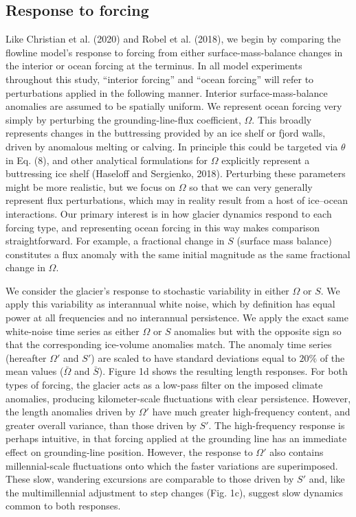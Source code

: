\documentclass[tc, manuscript]{copernicus}
\begin{document}
\subsection{Response to forcing}

Like Christian et al. (2020) and Robel et al. (2018), we begin by comparing the flowline model's response to forcing from either surface-mass-balance changes in the interior or ocean forcing at the terminus. In all model experiments throughout this study, “interior forcing” and “ocean forcing” will refer to perturbations applied in the following manner. Interior surface-mass-balance anomalies are assumed to be spatially uniform. We represent ocean forcing very simply by perturbing the grounding-line-flux coefficient, $\Omega$. This broadly represents changes in the buttressing provided by an ice shelf or fjord walls, driven by anomalous melting or calving. In principle this could be targeted via $\theta$ in Eq. (8), and other analytical formulations for $\Omega$ explicitly represent a buttressing ice shelf (Haseloff and Sergienko, 2018). Perturbing these parameters might be more realistic, but we focus on $\Omega$ so that we can very generally represent flux perturbations, which may in reality result from a host of ice–ocean interactions. Our primary interest is in how glacier dynamics respond to each forcing type, and representing ocean forcing in this way makes comparison straightforward. For example, a fractional change in $S$ (surface mass balance) constitutes a flux anomaly with the same initial magnitude as the same fractional change in $\Omega$.

We consider the glacier's response to stochastic variability in either $\Omega$ or $S$. We apply this variability as interannual white noise, which by definition has equal power at all frequencies and no interannual persistence. We apply the exact same white-noise time series as either $\Omega$ or $S$ anomalies but with the opposite sign so that the corresponding ice-volume anomalies match. The anomaly time series (hereafter $\Omega'$ and $S'$) are scaled to have standard deviations equal to $20\%$ of the mean values ($\bar{\Omega}$ and $\bar{S}$). Figure 1d shows the resulting length responses. For both types of forcing, the glacier acts as a low-pass filter on the imposed climate anomalies, producing kilometer-scale fluctuations with clear persistence. However, the length anomalies driven by $\Omega'$ have much greater high-frequency content, and greater overall variance, than those driven by $S'$. The high-frequency response is perhaps intuitive, in that forcing applied at the grounding line has an immediate effect on grounding-line position. However, the response to $\Omega'$ also contains millennial-scale fluctuations onto which the faster variations are superimposed. These slow, wandering excursions are comparable to those driven by $S'$ and, like the multimillennial adjustment to step changes (Fig. 1c), suggest slow dynamics common to both responses.
\end{document}

